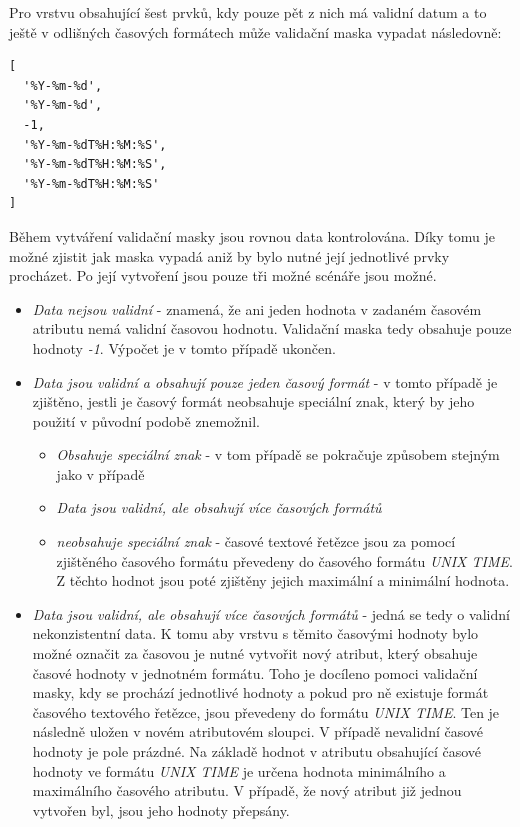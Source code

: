 Pro vrstvu obsahující šest prvků, kdy pouze pět z nich má validní datum a to ještě v odlišných časových formátech může validační maska vypadat následovně:

\begin{verbatim}
[
  '%Y-%m-%d',
  '%Y-%m-%d',
  -1,
  '%Y-%m-%dT%H:%M:%S',
  '%Y-%m-%dT%H:%M:%S',
  '%Y-%m-%dT%H:%M:%S'
]
\end{verbatim}

Během vytváření validační masky jsou rovnou data kontrolována. Díky tomu je možné zjistit jak maska vypadá aniž by bylo nutné její jednotlivé prvky procházet. Po její vytvoření jsou pouze tři možné scénáře jsou možné.

\begin{itemize}
	\item\textit{Data nejsou validní} - znamená, že ani jeden hodnota v zadaném časovém atributu nemá validní časovou hodnotu. Validační maska tedy obsahuje pouze hodnoty \textit{-1}. Výpočet je v tomto případě ukončen.
	\item\textit{Data jsou validní a obsahují pouze jeden časový formát} - v tomto případě je zjištěno, jestli je časový formát neobsahuje speciální znak, který by jeho použití v původní podobě znemožnil.
	\begin{itemize}
		\item\textit{Obsahuje speciální znak} - v tom případě se pokračuje způsobem stejným jako v případě \item\textit{Data jsou validní, ale obsahují více časových formátů}
		\item\textit{neobsahuje speciální znak} - časové textové řetězce jsou za pomocí zjištěného časového formátu převedeny do časového formátu \textit{UNIX TIME}. Z těchto hodnot jsou poté zjištěny jejich maximální a minimální hodnota.
	\end{itemize}
	\item\textit{Data jsou validní, ale obsahují více časových formátů} - jedná se tedy o validní nekonzistentní data. K tomu aby vrstvu s těmito časovými hodnoty bylo možné označit za časovou je nutné vytvořit nový atribut, který obsahuje časové hodnoty v jednotném formátu. Toho je docíleno pomoci validační masky, kdy se prochází jednotlivé hodnoty a pokud pro ně existuje formát časového textového řetězce, jsou převedeny do formátu \textit{UNIX TIME}. Ten je následně uložen v novém atributovém sloupci. V případě nevalidní časové hodnoty je pole prázdné. Na základě hodnot v atributu obsahující časové hodnoty ve formátu \textit{UNIX TIME} je určena hodnota minimálního a maximálního časového atributu.
	V případě, že nový atribut již jednou vytvořen byl, jsou jeho hodnoty přepsány.
\end{itemize}

